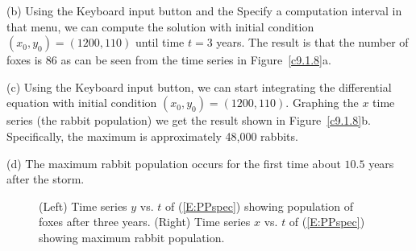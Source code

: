 \documentclass{ximera}
\begin{document}
\begin{exercise}
\begin{solution}
\noindent (b) Using the {\sf Keyboard input} button and the {\sf Specify a
computation interval} in that menu, we can compute the solution with initial
condition $(x_0,y_0)=(1200,110)$ until time $t=3$ years.  The result is that
the number of foxes is $86$ as can be seen from the time series in 
Figure~\ref{c9.1.8}a.

\noindent (c)  Using the {\sf Keyboard input} button, we can start
integrating the differential equation with initial condition
$(x_0,y_0)=(1200,110)$.  Graphing the $x$ time series (the rabbit population)
we get the result shown in Figure~\ref{c9.1.8}b.  Specifically, the 
maximum is approximately 48,000 rabbits. 

\noindent (d)  The maximum rabbit population occurs for the first time about 
$10.5$ years after the storm.

\begin{figure}[htb]
     \centerline{%
     }
     \caption{(Left) Time series $y$ vs. $t$ of (\protect\ref{E:PPspec}) 
	showing population of foxes after three years. (Right) Time series $x$ 
	vs. $t$ of (\protect\ref{E:PPspec}) showing maximum rabbit population.}
\end{figure}


\end{solution}
\end{exercise}
\end{document}
